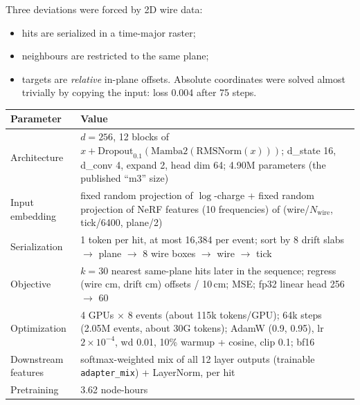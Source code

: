 \documentclass[11pt,a4paper]{article}
\newcommand{\code}[1]{\texttt{\small #1}}
\begin{document}
Three deviations were forced by 2D wire data:
\begin{itemize}
  \item hits are serialized in a time-major raster;
  \item neighbours are restricted to the same plane;
  \item targets are \emph{relative} in-plane offsets. Absolute coordinates were solved almost trivially by copying the input: loss 0.004 after 75 steps.
\end{itemize}
\begin{center}\small
\begin{tabularx}{\textwidth}{lL}
\toprule
Parameter & Value\\
\midrule
Architecture & $d=256$, 12 blocks of $x + \text{Dropout}_{0.1}(\text{Mamba2}(\text{RMSNorm}(x)))$; d\_state 16, d\_conv 4, expand 2, head dim 64; 4.90M parameters (the published ``m3'' size)\\
Input embedding & fixed random projection of $\log$-charge + fixed random projection of NeRF features (10 frequencies) of (wire/$N_\text{wire}$, tick/6400, plane/2)\\
Serialization & 1 token per hit, at most 16{,}384 per event; sort by 8 drift slabs $\to$ plane $\to$ 8 wire boxes $\to$ wire $\to$ tick\\
Objective & $k=30$ nearest same-plane hits later in the sequence; regress (wire cm, drift cm) offsets / 10\,cm; MSE; fp32 linear head 256 $\to$ 60\\
Optimization & 4 GPUs $\times$ 8 events (about 115k tokens/GPU); 64k steps (2.05M events, about 30G tokens); AdamW (0.9, 0.95), lr $2\times10^{-4}$, wd 0.01, 10\% warmup + cosine, clip 0.1; bf16\\
Downstream features & softmax-weighted mix of all 12 layer outputs (trainable \code{adapter\_mix}) + LayerNorm, per hit\\
Pretraining & 3.62 node-hours\\
\bottomrule
\end{tabularx}
\end{center}
\end{document}
